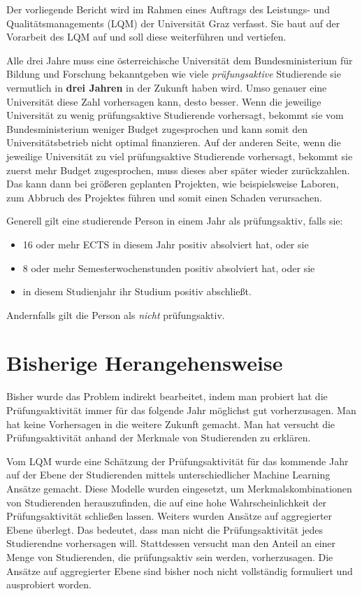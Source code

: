 

Der vorliegende Bericht wird im Rahmen eines Auftrags des Leistungs- und Qualit\"atsmanagements (LQM) der
Universität Graz verfasst. Sie baut auf der Vorarbeit des LQM auf und soll diese weiterf\"uhren 
und vertiefen.

Alle drei Jahre muss eine \"osterreichische Universität dem Bundesministerium f\"ur Bildung und Forschung
bekanntgeben wie viele \textit{pr\"ufungsaktive} Studierende sie vermutlich in \textbf{drei Jahren} 
in der Zukunft haben wird. Umso genauer eine Universität diese Zahl vorhersagen kann, desto besser.
Wenn die jeweilige Universität zu wenig pr\"ufungsaktive Studierende vorhersagt, bekommt sie vom Bundesministerium
weniger Budget zugesprochen und kann somit den Universitätsbetrieb nicht optimal finanzieren. Auf der anderen Seite,
wenn die jeweilige Universität zu viel pr\"ufungsaktive Studierende vorhersagt, bekommt sie zuerst mehr Budget zugesprochen,
muss dieses aber sp\"ater wieder zur\"uckzahlen. Das kann dann bei gr\"o{\ss}eren geplanten Projekten, wie beispielsweise Laboren,
zum Abbruch des Projektes f\"uhren und somit einen Schaden verursachen.

\noindent Generell gilt eine studierende Person in einem Jahr als pr\"ufungsaktiv, falls sie:

\begin{itemize}
    \item 16 oder mehr ECTS in diesem Jahr positiv absolviert hat, oder sie
    \item 8 oder mehr Semesterwochenstunden positiv absolviert hat, oder sie
    \item in diesem Studienjahr ihr Studium positiv abschlie{\ss}t.
\end{itemize}
Andernfalls gilt die Person als \textit{nicht} pr\"ufungsaktiv.





\section{Bisherige Herangehensweise}
Bisher wurde das Problem indirekt bearbeitet, indem man probiert hat die Pr\"ufungsaktivit\"at
immer f\"ur das folgende Jahr m\"oglichst gut vorherzusagen. Man hat keine Vorhersagen in die weitere Zukunft gemacht.
Man hat versucht die Pr\"ufungsaktivit\"at anhand der Merkmale von Studierenden zu erkl\"aren.

Vom LQM wurde eine Sch\"atzung der Pr\"ufungsaktivit\"at f\"ur das kommende Jahr auf der Ebene der Studierenden
mittels unterschiedlicher Machine Learning Ans\"atze gemacht. Diese Modelle wurden eingesetzt, um Merkmalskombinationen von Studierenden herauszufinden, 
die auf eine hohe Wahrscheinlichkeit der Pr\"ufungsaktivit\"at schlie{\ss}en lassen.
Weiters wurden Ans\"atze auf aggregierter Ebene \"uberlegt. Das bedeutet, dass man nicht die Pr\"ufungsaktivit\"at jedes Studierendne vorhersagen will. Stattdessen
versucht man den Anteil an einer Menge von Studierenden, die pr\"ufungsaktiv sein werden, vorherzusagen. 
Die Ans\"atze auf aggregierter Ebene sind bisher noch nicht vollst\"andig formuliert und ausprobiert worden.